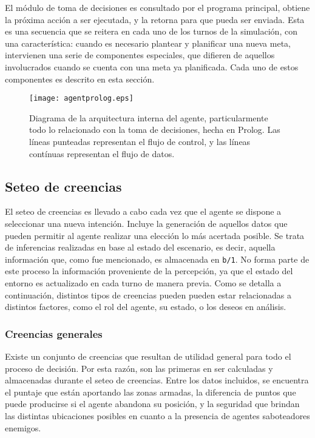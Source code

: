 \documentclass[oneside]{book}
\begin{document}
El módulo de toma de decisiones es consultado por el programa principal, obtiene la 
próxima acción a ser ejecutada, y la retorna para que pueda ser enviada. Esta es una 
secuencia que se reitera en cada uno de los turnos de la simulación, con una característica:
cuando es necesario plantear y planificar una nueva meta, intervienen una serie de 
componentes especiales, que difieren de aquellos involucrados cuando se cuenta con una 
meta ya planificada. Cada uno de estos componentes es descrito en esta sección.

\begin{figure}[h]
 \centering
 \texttt{[image: agentprolog.eps]}
 \caption{Diagrama de la arquitectura interna del agente, particularmente todo lo relacionado 
 con la toma de decisiones, hecha en Prolog. Las líneas punteadas representan el 
 flujo de control, y las líneas contínuas representan el flujo de datos.}
 \label{fig:agentProlog}
\end{figure}

\subsection{Seteo de creencias}

\label{sec:seteoCreencias}

El seteo de creencias es llevado a cabo cada vez que el agente se dispone a 
seleccionar una nueva intención. Incluye la generación de aquellos datos que pueden 
permitir al agente realizar una elección lo más acertada posible. Se trata de 
inferencias realizadas en base al estado del escenario, es decir, aquella información 
que, como fue mencionado, es almacenada en \texttt{b/1}. No forma parte de este proceso 
la información proveniente de la percepción, ya que el estado del entorno es actualizado 
en cada turno de manera previa. Como se detalla a continuación, distintos tipos de 
creencias pueden pueden estar relacionadas a distintos factores, como el rol del agente, 
su estado, o los deseos en análisis.

\subsubsection{Creencias generales}

Existe un conjunto de creencias que resultan de utilidad general para todo el proceso 
de decisión. Por esta razón, son las primeras en ser calculadas y almacenadas durante 
el seteo de creencias. Entre los datos incluidos, se encuentra el puntaje que están 
aportando las zonas armadas, la diferencia de puntos que puede producirse si el agente 
abandona su posición, y la seguridad que brindan las distintas ubicaciones posibles en 
cuanto a la presencia de agentes saboteadores enemigos. 
\end{document}
